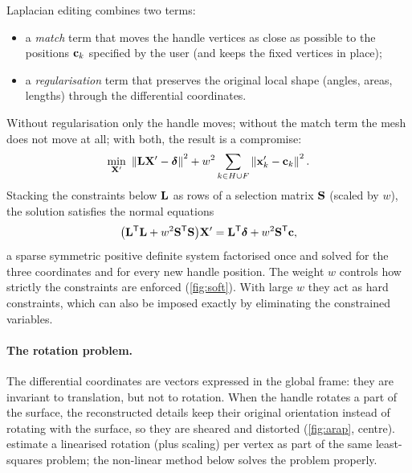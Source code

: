 Laplacian editing \citep{Sorkine2004} combines two terms:
\begin{itemize}
  \item a \emph{match} term that moves the handle vertices as close as possible to the positions
  $\mathbf{c}_k$ specified by the user (and keeps the fixed vertices in place);
  \item a \emph{regularisation} term that preserves the original local shape (angles, areas,
  lengths) through the differential coordinates.
\end{itemize}
Without regularisation only the handle moves; without the match term the mesh does not move at all;
with both, the result is a compromise:
\begin{equation}
\min_{\mX'}\ \norm{\mL\mX'-\bdelta}^2+w^2\sum_{k\in H\cup F}\norm{\bx'_k-\bc_k}^2 .
\end{equation}
Stacking the constraints below $\mathbf{L}$ as rows of a selection matrix $\mathbf{S}$ (scaled by $w$), the solution
satisfies the normal equations
\begin{equation}
\bigl(\mathbf{L}^{\mathsf{T}}\mathbf{L}+w^2\mathbf{S}^{\mathsf{T}}\mathbf{S}\bigr)\mathbf{X}'=\mathbf{L}^{\mathsf{T}}\boldsymbol{\delta}+w^2\mathbf{S}^{\mathsf{T}}\mathbf c ,
\end{equation}
a sparse symmetric positive definite system factorised once and solved for the three coordinates
and for every new handle position. The weight $w$ controls how strictly the constraints are
enforced (\cref{fig:soft}). With large $w$ they act as hard constraints, which can also be imposed
exactly by eliminating the constrained variables.


\paragraph{The rotation problem.} The differential coordinates are vectors expressed in the global
frame: they are invariant to translation, but not to rotation. When the handle rotates a part of the
surface, the reconstructed details keep their original orientation instead of rotating with the
surface, so they are sheared and distorted (\cref{fig:arap}, centre). \citet{Sorkine2004} estimate a
linearised rotation (plus scaling) per vertex as part of the same least-squares problem; the
non-linear method below solves the problem properly.

